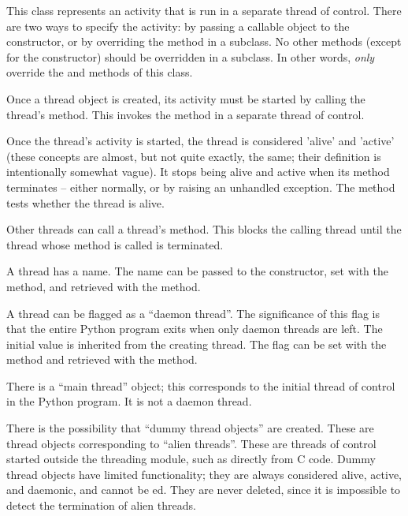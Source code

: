 This class represents an activity that is run in a separate thread
of control.  There are two ways to specify the activity: by
passing a callable object to the constructor, or by overriding the
 method in a subclass.  No other methods (except for the
constructor) should be overridden in a subclass.  In other words, 
\emph{only}  override the  and 
methods of this class.

Once a thread object is created, its activity must be started by
calling the thread's  method.  This invokes the
 method in a separate thread of control.

Once the thread's activity is started, the thread is considered
'alive' and 'active' (these concepts are almost, but not quite
exactly, the same; their definition is intentionally somewhat
vague).  It stops being alive and active when its 
method terminates -- either normally, or by raising an unhandled
exception.  The  method tests whether the thread is
alive.

Other threads can call a thread's  method.  This blocks
the calling thread until the thread whose  method is
called is terminated.

A thread has a name.  The name can be passed to the constructor,
set with the  method, and retrieved with the
 method.

A thread can be flagged as a ``daemon thread''.  The significance
of this flag is that the entire Python program exits when only
daemon threads are left.  The initial value is inherited from the
creating thread.  The flag can be set with the 
method and retrieved with the  method.

There is a ``main thread'' object; this corresponds to the
initial thread of control in the Python program.  It is not a
daemon thread.

There is the possibility that ``dummy thread objects'' are
created.  These are thread objects corresponding to ``alien
threads''.  These are threads of control started outside the
threading module, such as directly from C code.  Dummy thread objects
have limited functionality; they are always considered alive,
active, and daemonic, and cannot be ed.  They are never 
deleted, since it is impossible to detect the termination of alien
threads.


